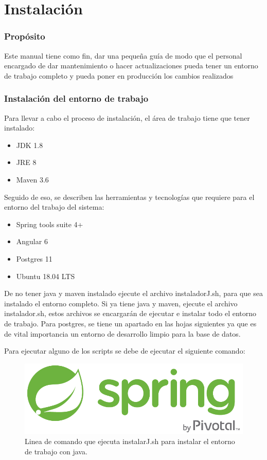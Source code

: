 \chapter{Instalación}

\subsection{Propósito}
Este manual tiene como fin, dar una pequeña guía de modo que el personal encargado de dar mantenimiento o hacer actualizaciones pueda tener un entorno de trabajo completo y pueda poner en producción los cambios realizados

\subsection{Instalación del entorno de trabajo}
Para llevar a cabo el proceso de instalación, el área de trabajo tiene que tener instalado:
\begin{itemize}
  \item JDK 1.8
  \item JRE 8
  \item Maven 3.6
\end{itemize}

Seguido de eso, se describen las herramientas y tecnologías que requiere para el entorno del trabajo del sistema:
\begin{itemize}
	\item Spring tools suite 4+
  \item Angular 6
  \item Postgres 11
  \item Ubuntu 18.04 LTS
\end{itemize}
De no tener java y maven instalado ejecute el archivo instaladorJ.sh, para que sea instalado el entorno completo.
Si ya tiene java y maven, ejecute el archivo instalador.sh, estos archivos se encargarán de ejecutar e instalar todo el entorno de trabajo.
Para postgres, se tiene un apartado en las hojas siguientes ya que es de vital importancia un entorno de desarrollo limpio para la base de datos.

Para ejecutar alguno de los scripts se debe de ejecutar el siguiente comando:


\begin{figure}[H]
  \centering
  \includegraphics[width=0.1\linewidth]{images/tecnologias/spring.png}
  \caption{Linea de comando que ejecuta instalarJ.sh para instalar el entorno de trabajo con java.}
\end{figure}

